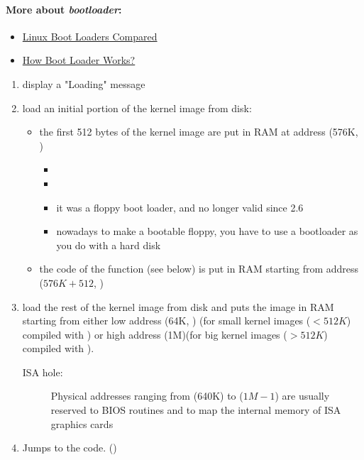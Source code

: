 \paragraph{More about \emph{bootloader}:}
\begin{itemize}
\item \href{http://lennartb.home.xs4all.nl/bootloaders/bootloaders.html}{Linux Boot
    Loaders Compared}
\item \href{http://lennartb.home.xs4all.nl/bootloaders/node3.html}{How Boot Loader Works?}
\end{itemize}
\begin{enumerate}
\item display a "Loading" message
\item load an initial portion of the kernel image from disk:
  \begin{itemize}
  \item the first 512 bytes of the kernel image are put in RAM at address
     (576K, )
    \begin{itemize}
    \item {}
    \item {}
    \item it was a floppy boot loader, and no longer valid since 2.6
    \item nowadays to make a bootable floppy, you have to use a bootloader as you do with
      a hard disk
    \end{itemize}
  \item the code of the  function (see below) is put in RAM starting
    from address  ($576K+512$, )
  \end{itemize}
\item load the rest of the kernel image from disk and puts the image in RAM starting from
  either low address  (64K, ) (for small kernel images ($< 512K$)
  compiled with ) or high address  (1M)(for big kernel
  images ($> 512K$) compiled with ).
  \begin{description}
  \item[ISA hole:] Physical addresses ranging from  (640K) to
     ($1M-1$) are usually reserved to BIOS routines and to map the
    internal memory of ISA graphics cards
  \end{description}
\item Jumps to the  code. ()
\end{enumerate}
